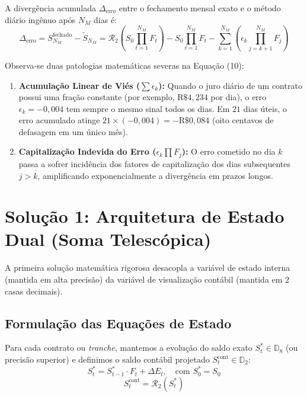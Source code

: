 \documentclass[11pt, a4paper]{article}
\begin{document}
A divergência acumulada $\Delta_{\text{erro}}$ entre o fechamento mensal exato e o método diário ingênuo após $N_M$ dias é:
\begin{equation}
    \Delta_{\text{erro}} = S_{N_M}^{\text{fechado}} - \tilde{S}_{N_M} = \mathcal{R}_2\left(S_0 \prod_{t=1}^{N_M} F_t\right) - S_0 \prod_{t=1}^{N_M} F_t - \sum_{k=1}^{N_M} \left( \epsilon_k \prod_{j=k+1}^{N_M} F_j \right)
\end{equation}

Observa-se duas patologias matemáticas severas na Equação (10):
\begin{enumerate}
    \item \textbf{Acumulação Linear de Viés ($\sum \epsilon_k$):} Quando o juro diário de um contrato possui uma fração constante (por exemplo, $\text{R\$ } 4{,}234$ por dia), o erro $\epsilon_k = -0{,}004$ tem sempre o mesmo sinal todos os dias. Em $21$ dias úteis, o erro acumulado atinge $21 \times (-0{,}004) = -\text{R\$ } 0{,}084$ (oito centavos de defasagem em um único mês).
    \item \textbf{Capitalização Indevida do Erro ($\epsilon_k \prod F_j$):} O erro cometido no dia $k$ passa a sofrer incidência dos fatores de capitalização dos dias subsequentes $j > k$, amplificando exponencialmente a divergência em prazos longos.
\end{enumerate}

\section{Solução 1: Arquitetura de Estado Dual (Soma Telescópica)}

A primeira solução matemática rigorosa desacopla a variável de estado interna (mantida em alta precisão) da variável de visualização contábil (mantida em $2$ casas decimais).

\subsection{Formulação das Equações de Estado}

Para cada contrato ou \textit{tranche}, mantemos a evolução do saldo exato $S_t^{*} \in \mathbb{D}_8$ (ou precisão superior) e definimos o saldo contábil projetado $S_t^{\text{cont}} \in \mathbb{D}_2$:
\begin{equation}
    S_t^{*} = S_{t-1}^{*} \cdot F_t + \Delta E_t, \quad \text{com } S_0^{*} = S_0
\end{equation}
\begin{equation}
    S_t^{\text{cont}} = \mathcal{R}_2 \left( S_t^{*} \right)
\end{equation}
\end{document}
